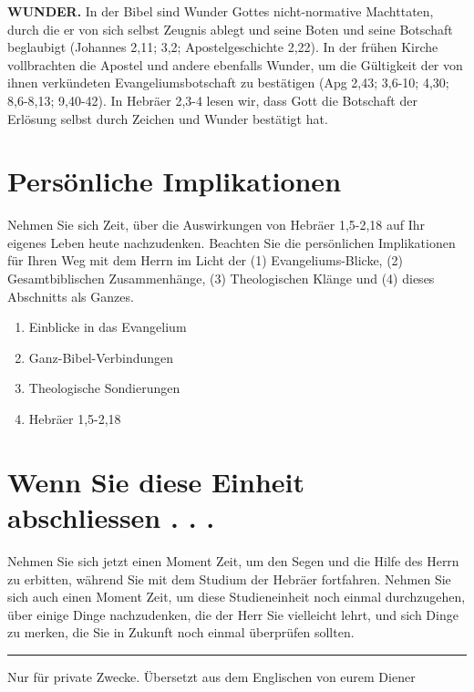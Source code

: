 \documentclass[]{book}
\providecommand{\tightlist}{%
  \setlength{\itemsep}{0pt}\setlength{\parskip}{0pt}}
\begin{document}
\textbf{WUNDER.} In der Bibel sind Wunder Gottes nicht-normative
Machttaten, durch die er von sich selbst Zeugnis ablegt und seine Boten
und seine Botschaft beglaubigt (Johannes 2,11; 3,2; Apostelgeschichte
2,22). In der frühen Kirche vollbrachten die Apostel und andere
ebenfalls Wunder, um die Gültigkeit der von ihnen verkündeten
Evangeliumsbotschaft zu bestätigen (Apg 2,43; 3,6-10; 4,30; 8,6-8,13;
9,40-42). In Hebräer 2,3-4 lesen wir, dass Gott die Botschaft der
Erlösung selbst durch Zeichen und Wunder bestätigt hat.

\section{Persönliche
Implikationen}\label{persuxf6nliche-implikationen-1}

Nehmen Sie sich Zeit, über die Auswirkungen von Hebräer 1,5-2,18 auf Ihr
eigenes Leben heute nachzudenken. Beachten Sie die persönlichen
Implikationen für Ihren Weg mit dem Herrn im Licht der (1)
Evangeliums-Blicke, (2) Gesamtbiblischen Zusammenhänge, (3)
Theologischen Klänge und (4) dieses Abschnitts als Ganzes.

\begin{enumerate}
\def\labelenumi{\arabic{enumi}.}
\tightlist
\item
  Einblicke in das Evangelium
\item
  Ganz-Bibel-Verbindungen
\item
  Theologische Sondierungen
\item
  Hebräer 1,5-2,18
\end{enumerate}

\section{Wenn Sie diese Einheit abschliessen . .
.}\label{wenn-sie-diese-einheit-abschliessen-.-.-.-1}

Nehmen Sie sich jetzt einen Moment Zeit, um den Segen und die Hilfe des
Herrn zu erbitten, während Sie mit dem Studium der Hebräer fortfahren.
Nehmen Sie sich auch einen Moment Zeit, um diese Studieneinheit noch
einmal durchzugehen, über einige Dinge nachzudenken, die der Herr Sie
vielleicht lehrt, und sich Dinge zu merken, die Sie in Zukunft noch
einmal überprüfen sollten.

\begin{center}\rule{0.5\linewidth}{0.5pt}\end{center}

Nur für private Zwecke. Übersetzt aus dem Englischen von eurem Diener
\end{document}
